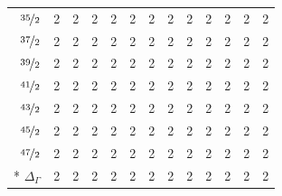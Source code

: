 \documentclass[10pt,a4paper]{article}
\makeatletter
\def\grouprule#1#2{\noalign{\marks\LTgroupmarks{\the\belowrulesep}\nobreak\vskip#1%
  \vskip\aboverulesep}\multispan\LT@cols\unskip{\leaders\hrule\@height#2\hfill\kern\z@}\cr
  \noalign{\penalty\LTrulebreak\vskip\belowrulesep\global\@lastruleclass\z@}}
\numberwithin{equation}{section}
\makeatother
\begin{document}
{\begin{longtable}{@{}rrrrrrrrrrrrr@{}}
$\nicefrac{35}{2}$ & 2 & 2 & 2 & 2 & 2 & 2 & 2 & 2 & 2 & 2 & 2 & 2\\
$\nicefrac{37}{2}$ & 2 & 2 & 2 & 2 & 2 & 2 & 2 & 2 & 2 & 2 & 2 & 2\\
$\nicefrac{39}{2}$ & 2 & 2 & 2 & 2 & 2 & 2 & 2 & 2 & 2 & 2 & 2 & 2\\
$\nicefrac{41}{2}$ & 2 & 2 & 2 & 2 & 2 & 2 & 2 & 2 & 2 & 2 & 2 & 2\\
$\nicefrac{43}{2}$ & 2 & 2 & 2 & 2 & 2 & 2 & 2 & 2 & 2 & 2 & 2 & 2\\
$\nicefrac{45}{2}$ & 2 & 2 & 2 & 2 & 2 & 2 & 2 & 2 & 2 & 2 & 2 & 2\\
$\nicefrac{47}{2}$ & 2 & 2 & 2 & 2 & 2 & 2 & 2 & 2 & 2 & 2 & 2 & 2\\*
\grouprule{0pt}{\lightrulewidth} $\Delta_\Gamma$ & 2 & 2 & 2 & 2 & 2 & 2 & 2 & 2 & 2 & 2 & 2 & 2\\
\bottomrule\end{longtable}}
\end{document}
